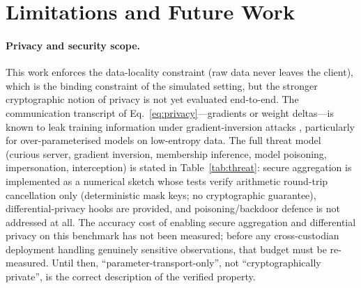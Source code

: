 \section{Limitations and Future Work}\label{sec:limitations}

\paragraph{Privacy and security scope.}
This work enforces the data-locality constraint (raw data never
leaves the client), which is the binding constraint of the simulated
setting, but the stronger cryptographic notion of privacy is not yet
evaluated end-to-end. The communication transcript of
Eq.~\eqref{eq:privacy}---gradients or weight deltas---is known to
leak training information under gradient-inversion attacks
\cite{zhu2019}, particularly for over-parameterised models on
low-entropy data. The full threat model (curious server, gradient
inversion, membership inference, model poisoning, impersonation,
interception) is stated in Table~\ref{tab:threat}: secure aggregation
is implemented as a numerical sketch whose tests verify arithmetic
round-trip cancellation only (deterministic mask keys; no
cryptographic guarantee), differential-privacy hooks are provided,
and poisoning/backdoor defence is not addressed at all. The
accuracy cost of enabling secure aggregation and differential privacy
on this benchmark has not been measured; before any cross-custodian
deployment handling genuinely sensitive observations, that budget must
be re-measured. Until then, ``parameter-transport-only'', not
``cryptographically private'', is the correct description of the
verified property.

